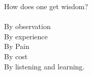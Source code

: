 \begin{compactenum}
    \item How does one get wisdom?\\
    \\
    By observation\\
    By experience\\
    By Pain\\
    By cost\\
    By listening and learning.
    
\end{compactenum}

